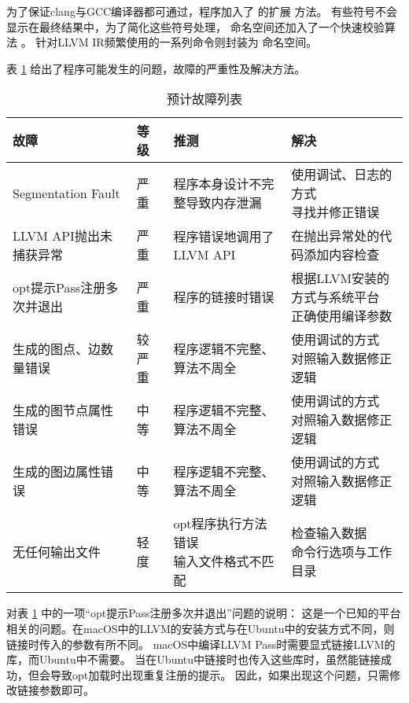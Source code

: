 为了保证clang与GCC编译器都可通过，程序加入了  的扩展  方法。
有些符号不会显示在最终结果中，为了简化这些符号处理， 命名空间还加入了一个快速校验算法 。
针对LLVM IR频繁使用的一系列命令则封装为  命名空间。

表 \ref{tab:fault} 给出了程序可能发生的问题，故障的严重性及解决方法。

\begin{table}[!hbt]
\centering
\caption{预计故障列表} \label{tab:fault}
\renewcommand{\arraystretch}{2.62}
\footnotesize
\begin{tabular}{llll}
\hline 故障 & 等级 & 推测 & 解决 \\ \hline
Segmentation Fault & 严重 & 程序本身设计不完整导致内存泄漏 & \makecell[l]{使用调试、日志的方式 \\ 寻找并修正错误} \\
LLVM API抛出未捕获异常 & 严重 & 程序错误地调用了LLVM API & 在抛出异常处的代码添加内容检查 \\
opt提示Pass注册多次并退出 & 严重 & 程序的链接时错误 & \makecell[l]{根据LLVM安装的方式与系统平台 \\ 正确使用编译参数} \\
生成的图点、边数量错误 & 较严重 & 程序逻辑不完整、算法不周全 & \makecell[l]{使用调试的方式 \\ 对照输入数据修正逻辑} \\
生成的图节点属性错误 & 中等 & 程序逻辑不完整、算法不周全 & \makecell[l]{使用调试的方式 \\ 对照输入数据修正逻辑} \\
生成的图边属性错误 & 中等 & 程序逻辑不完整、算法不周全 & \makecell[l]{使用调试的方式 \\ 对照输入数据修正逻辑} \\
无任何输出文件 & 轻度 & \makecell[l]{opt程序执行方法错误 \\ 输入文件格式不匹配} & \makecell[l]{检查输入数据 \\ 命令行选项与工作目录} \\
\hline
\end{tabular}
\end{table}

对表 \ref{tab:fault} 中的一项“opt提示Pass注册多次并退出”问题的说明：
这是一个已知的平台相关的问题。在macOS中的LLVM的安装方式与在Ubuntu中的安装方式不同，则链接时传入的参数有所不同。
macOS中编译LLVM Pass时需要显式链接LLVM的库，而Ubuntu中不需要。
当在Ubuntu中链接时也传入这些库时，虽然能链接成功，但会导致opt加载时出现重复注册的提示。
因此，如果出现这个问题，只需修改链接参数即可。

